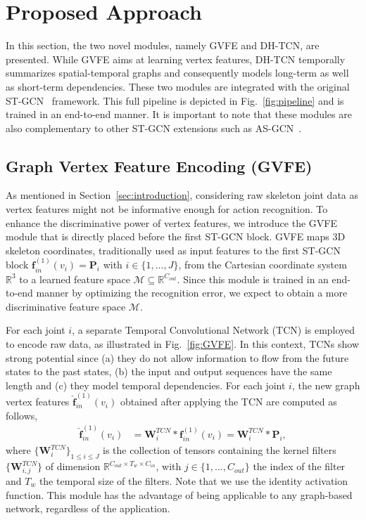 \documentclass{article}
\begin{document}
\section{Proposed Approach}
\label{sec:pipeline}

In this section, the two novel modules, namely GVFE and DH-TCN, are presented. While GVFE aims at learning vertex features, DH-TCN temporally summarizes spatial-temporal graphs and consequently models long-term as well as short-term dependencies. These two modules are integrated with the original ST-GCN~\cite{yan2018spatial} framework. This full pipeline is depicted in Fig.~\ref{fig:pipeline} and is trained in an end-to-end manner. It is important to note that these modules are also complementary to other ST-GCN extensions such as AS-GCN~\cite{li2019actional}.


\subsection{Graph Vertex Feature Encoding (GVFE)}
\label{sec:gvfe}

As mentioned in Section~\ref{sec:introduction}, considering raw skeleton joint data as vertex features might not be informative enough for action recognition. To enhance the discriminative power of vertex features, we introduce the GVFE module that is directly placed before the first ST-GCN block. GVFE maps 3D skeleton coordinates, traditionally used as input features to the first ST-GCN block $\mathbf f_{in}^{(1)}(v_i)=\mathbf P_i$ with $i \in \{1,...,J\}$, from the Cartesian coordinate system $\mathbb{R}^3$ to a learned feature space $\mathcal{M}\subseteq \mathbb{R}^{C_{out}}$. Since this module is trained in an end-to-end manner by optimizing the recognition error, we expect to obtain a more discriminative feature space $\mathcal{M}$.


For each joint $i$, a separate Temporal Convolutional Network (TCN) is employed to encode raw data, as illustrated in Fig.~\ref{fig:GVFE}. In this context, TCNs show strong potential since (a) they do not allow information to flow from the future states to the past states, (b) the input and output sequences have the same length and (c) they model temporal dependencies. For each joint $i$, the new graph vertex features $\mathbf{\hat {f}}_{in}^{(1)}(v_i)$ obtained after applying the TCN are computed as follows,
\begin{align}
    \mathbf{\hat {f}}_{in}^{(1)}(v_i) &= \mathbf{W}_i^{TCN} \ast  \mathbf f_{in}^{(1)}(v_i)= \mathbf{W}_i^{TCN} \ast \mathbf{P}_i,
\end{align}
\noindent where $\{\mathbf{W}^{TCN}_i\}_{1 \leq i \leq J}$ is the collection of tensors containing the kernel filters $\{\mathbf{W}^{TCN}_{i,j}\}$
of dimension $\mathbb R^{C_{out} \times T_w \times C_{in}}$, with $j \in \{1,...,C_{out}\}$ the index of the filter and $T_w$ the temporal size of the filters. Note that we use the identity activation function. 
This module has the advantage of being applicable to any graph-based network, regardless of the application.
\end{document}
